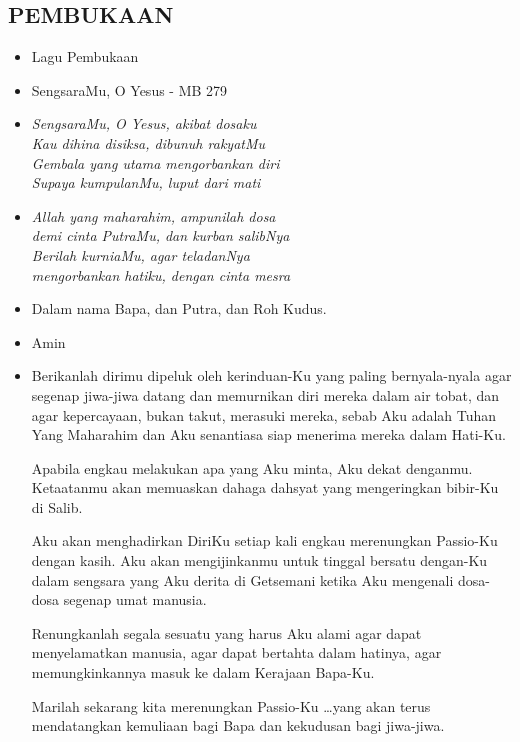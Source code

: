 \documentclass[a5paper,headsepline,titlepage,10pt,nnormalheadings,DIVcalc]{scrbook}
\newcommand{\BU}[1]{\begin{itemize} \item[U:] #1 \end{itemize}}
\newcommand{\BP}[1]{\begin{itemize} \item[P:] #1 \end{itemize}}
\begin{document}
\subsection*{PEMBUKAAN}
\begin{itemize}
\item[~] Lagu Pembukaan
\item[~] SengsaraMu, O Yesus - MB 279
\item[1.] \it{
SengsaraMu, O Yesus, akibat dosaku\\
Kau dihina disiksa, dibunuh rakyatMu\\
Gembala yang utama mengorbankan diri\\
Supaya kumpulanMu, luput dari mati 
}
\item[3.] \it{
Allah yang maharahim, ampunilah dosa\\
demi cinta PutraMu, dan kurban salibNya\\
Berilah kurniaMu, agar teladanNya\\
mengorbankan hatiku, dengan cinta mesra
}
\end{itemize}

\BP{Dalam nama Bapa, dan Putra, dan Roh Kudus. }
\BU{Amin}
 
\BP{Berikanlah dirimu dipeluk oleh kerinduan-Ku yang paling bernyala-nyala agar segenap jiwa-jiwa datang dan memurnikan diri mereka dalam air tobat, dan agar kepercayaan, bukan takut, merasuki mereka, sebab Aku adalah Tuhan Yang Maharahim dan Aku senantiasa siap menerima mereka dalam Hati-Ku.

Apabila engkau melakukan apa yang Aku minta, Aku dekat denganmu. Ketaatanmu akan memuaskan dahaga dahsyat yang mengeringkan bibir-Ku di Salib.

Aku akan menghadirkan DiriKu setiap kali engkau merenungkan Passio-Ku dengan kasih. Aku akan mengijinkanmu untuk tinggal bersatu dengan-Ku dalam sengsara yang Aku derita di Getsemani ketika Aku mengenali dosa-dosa segenap umat manusia.

Renungkanlah segala sesuatu yang harus Aku alami agar dapat menyelamatkan manusia, agar dapat bertahta dalam hatinya, agar memungkinkannya masuk ke dalam Kerajaan Bapa-Ku.

Marilah sekarang kita merenungkan Passio-Ku \dots yang akan terus mendatangkan kemuliaan bagi Bapa dan kekudusan bagi jiwa-jiwa.}
\end{document}
